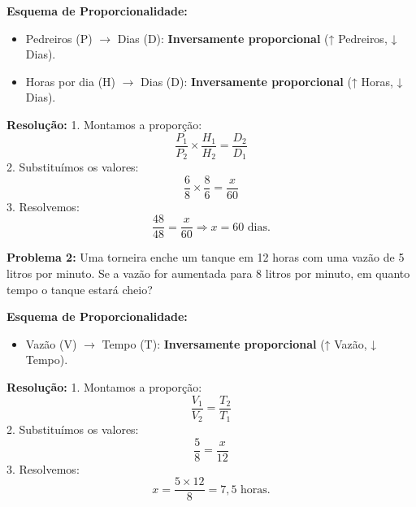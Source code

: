\documentclass[12pt]{article}
\begin{document}
\begin{multicols}{2}
\textbf{Esquema de Proporcionalidade:}
\begin{itemize}
    \item Pedreiros (P) $\rightarrow$ Dias (D): \textbf{Inversamente proporcional} (↑ Pedreiros, ↓ Dias).
    \item Horas por dia (H) $\rightarrow$ Dias (D): \textbf{Inversamente proporcional} (↑ Horas, ↓ Dias).
\end{itemize}

\textbf{Resolução:}
1. Montamos a proporção:
\[
\frac{P_1}{P_2} \times \frac{H_1}{H_2} = \frac{D_2}{D_1}
\]
2. Substituímos os valores:
\[
\frac{6}{8} \times \frac{8}{6} = \frac{x}{60}
\]
3. Resolvemos:
\[
\frac{48}{48} = \frac{x}{60} \Rightarrow x = 60 \text{ dias.}
\]

\textbf{Problema 2:} Uma torneira enche um tanque em 12 horas com uma vazão de 5 litros por minuto. Se a vazão for aumentada para 8 litros por minuto, em quanto tempo o tanque estará cheio?

\textbf{Esquema de Proporcionalidade:}
\begin{itemize}
    \item Vazão (V) $\rightarrow$ Tempo (T): \textbf{Inversamente proporcional} (↑ Vazão, ↓ Tempo).
\end{itemize}

\textbf{Resolução:}
1. Montamos a proporção:
\[
\frac{V_1}{V_2} = \frac{T_2}{T_1}
\]
2. Substituímos os valores:
\[
\frac{5}{8} = \frac{x}{12}
\]
3. Resolvemos:
\[
x = \frac{5 \times 12}{8} = 7,5 \text{ horas.}
\]

\end{multicols}
\end{document}
